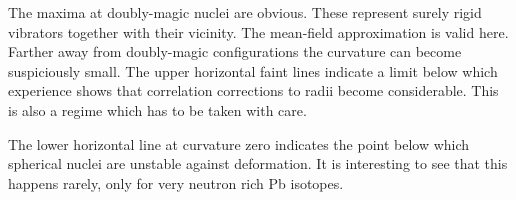 \documentclass[12pt]{article}
\begin{document}
The maxima at doubly-magic nuclei are obvious. These represent surely
rigid vibrators together with their vicinity. The mean-field
approximation is valid here. Farther away from doubly-magic
configurations the curvature can become suspiciously small. The upper
horizontal faint lines indicate a limit below which experience shows
that correlation corrections to  radii become considerable. This is
also a regime which has to be taken with care.

The lower horizontal line at curvature zero indicates the point below
which spherical nuclei are unstable against deformation. It is
interesting to see that this happens rarely, only for very neutron rich
Pb isotopes. 





\end{document}
